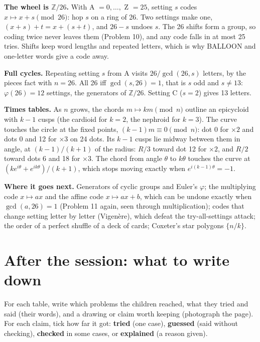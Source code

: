 \documentclass[11pt]{article}
\begin{document}
\textbf{The wheel is $\mathbb{Z}/26$.} With A $=0,\dots,$ Z $=25$, setting $s$ codes $x\mapsto x+s \pmod{26}$:
hop $s$ on a ring of 26. Two settings make one, $(x+s)+t=x+(s+t)$, and $26-s$ undoes $s$. The 26 shifts form a
group, so coding twice never leaves them (Problem 10), and any code falls in at most 25 tries. Shifts keep word
lengths and repeated letters, which is why BALLOON and one-letter words give a code away.

\textbf{Full cycles.} Repeating setting $s$ from A visits $26/\gcd(26,s)$ letters, by the pieces fact with
$n=26$. All 26 iff $\gcd(s,26)=1$, that is $s$ odd and $s\neq13$: $\varphi(26)=12$ settings, the generators of
$\mathbb{Z}/26$. Setting C ($s=2$) gives 13 letters.

\textbf{Times tables.} As $n$ grows, the chords $m\mapsto km \pmod n$ outline an epicycloid with $k-1$ cusps
(the cardioid for $k=2$, the nephroid for $k=3$). The curve touches the circle at the fixed points,
$(k-1)m\equiv0 \pmod n$: dot 0 for $\times2$ and dots 0 and 12 for $\times3$ on 24 dots. Its $k-1$ cusps lie
midway between them in angle, at $(k-1)/(k+1)$ of the radius: $R/3$ toward dot 12 for $\times2$, and $R/2$
toward dots 6 and 18 for $\times3$. The chord from angle $\theta$ to $k\theta$ touches the curve at
$(ke^{i\theta}+e^{ik\theta})/(k+1)$, which stops moving exactly when $e^{i(k-1)\theta}=-1$.

\textbf{Where it goes next.} Generators of cyclic groups and Euler's $\varphi$; the multiplying code
$x\mapsto ax$ and the affine code $x\mapsto ax+b$, which can be undone exactly when $\gcd(a,26)=1$ (Problem 11
again, seen through multiplication); codes that change setting letter by letter (Vigenère), which defeat the
try-all-settings attack; the order of a perfect shuffle of a deck of cards; Coxeter's star polygons $\{n/k\}$.

\section{After the session: what to write down}

For each table, write which problems the children reached, what they tried and said (their words), and a
drawing or claim worth keeping (photograph the page). For each claim, tick how far it got: \textbf{tried} (one
case), \textbf{guessed} (said without checking), \textbf{checked} in some cases, or \textbf{explained} (a reason
given).
\end{document}
